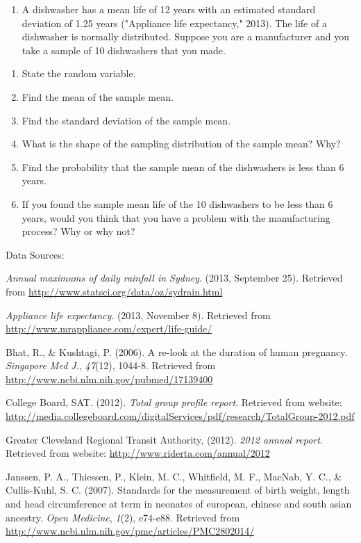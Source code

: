 \documentclass[]{book}
\providecommand{\tightlist}{%
  \setlength{\itemsep}{0pt}\setlength{\parskip}{0pt}}
\begin{document}
\begin{enumerate}
\def\labelenumi{\arabic{enumi}.}
\setcounter{enumi}{7}
\tightlist
\item
  A dishwasher has a mean life of 12 years with an estimated standard deviation of 1.25 years ("Appliance life expectancy," 2013). The life of a dishwasher is normally distributed. Suppose you are a manufacturer and you take a sample of 10 dishwashers that you made.
\end{enumerate}

\begin{enumerate}
\def\labelenumi{\alph{enumi}.}
\item
  State the random variable.
\item
  Find the mean of the sample mean.
\item
  Find the standard deviation of the sample mean.
\item
  What is the shape of the sampling distribution of the sample mean? Why?
\item
  Find the probability that the sample mean of the dishwashers is less than 6 years.
\item
  If you found the sample mean life of the 10 dishwashers to be less than 6 years, would you think that you have a problem with the manufacturing process? Why or why not?
\end{enumerate}

Data Sources:

\emph{Annual maximums of daily rainfall in Sydney}. (2013, September 25).
Retrieved from \url{http://www.statsci.org/data/oz/sydrain.html}

\emph{Appliance life expectancy}. (2013, November 8). Retrieved from
\url{http://www.mrappliance.com/expert/life-guide/}

Bhat, R., \& Kushtagi, P. (2006). A re-look at the duration of human
pregnancy. \emph{Singapore Med J.}, \emph{47}(12), 1044-8. Retrieved from
\url{http://www.ncbi.nlm.nih.gov/pubmed/17139400}

College Board, SAT. (2012). \emph{Total group profile report}. Retrieved from
website:
\url{http://media.collegeboard.com/digitalServices/pdf/research/TotalGroup-2012.pdf}

Greater Cleveland Regional Transit Authority, (2012). \emph{2012 annual
report}. Retrieved from website: \url{http://www.riderta.com/annual/2012}

Janssen, P. A., Thiessen, P., Klein, M. C., Whitfield, M. F., MacNab, Y.
C., \& Cullis-Kuhl, S. C. (2007). Standards for the measurement of birth
weight, length and head circumference at term in neonates of european,
chinese and south asian ancestry. \emph{Open Medicine}, \emph{1}(2), e74-e88.
Retrieved from \url{http://www.ncbi.nlm.nih.gov/pmc/articles/PMC2802014/}
\end{document}
